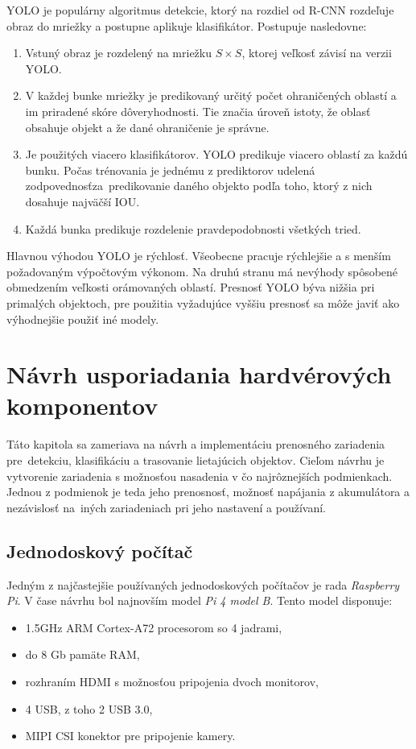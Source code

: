         \ac{YOLO} je populárny algoritmus detekcie, ktorý na rozdiel od \ac{R-CNN} rozdeľuje obraz do mriežky a postupne aplikuje klasifikátor. Postupuje nasledovne:

        \begin{enumerate}
            \item Vstuný obraz je rozdelený na mriežku \(S \times S\), ktorej veľkosť závisí na verzii \ac{YOLO}.
            \item V každej bunke mriežky je predikovaný určitý počet ohraničených oblastí a im priradené skóre dôveryhodnosti. Tie značia úroveň istoty, že oblasť obsahuje objekt a že dané ohraničenie je správne.
            \item Je použitých viacero klasifikátorov. \ac{YOLO} predikuje viacero oblastí za každú bunku. Počas trénovania je jednému z prediktorov udelená zodpovednosť\linebreak za~predikovanie daného objekto podľa toho, ktorý z nich dosahuje najväčší \ac{IOU}.
            \item Každá bunka predikuje rozdelenie pravdepodobnosti všetkých tried.
        \end{enumerate}

        Hlavnou výhodou \ac{YOLO} je rýchlosť. Všeobecne pracuje rýchlejšie a s menším požadovaným výpočtovým výkonom. Na druhú stranu má nevýhody spôsobené obmedzením veľkosti orámovaných oblastí. Presnosť \ac{YOLO} býva nižšia pri primalých objektoch, pre použitia vyžadujúce vyššiu presnosť sa môže javiť ako výhodnejšie použiť iné modely.

\chapter{Návrh usporiadania hardvérových komponentov}

    Táto kapitola sa zameriava na návrh a implementáciu prenosného zariadenia pre~detekciu, klasifikáciu a trasovanie lietajúcich objektov. Cieľom návrhu je vytvorenie zariadenia s možnosťou nasadenia v čo najrôznejších podmienkach. Jednou z podmienok je teda jeho prenosnosť, možnosť napájania z akumulátora a nezávislosť na~iných zariadeniach pri jeho nastavení a používaní.

    \section{Jednodoskový počítač}
    
        Jedným z najčastejšie používaných jednodoskových počítačov je rada \emph{Raspberry Pi}. V čase návrhu bol najnovším model \emph{Pi 4 model B}. Tento model disponuje:
        \begin{itemize}
            \item 1.5GHz ARM Cortex-A72 procesorom so 4 jadrami,
            \item do 8 Gb pamäte RAM,
            \item rozhraním HDMI s možnosťou pripojenia dvoch monitorov,
            \item 4 USB, z toho 2 USB 3.0,
            \item MIPI CSI konektor pre pripojenie kamery.
        \end{itemize}


